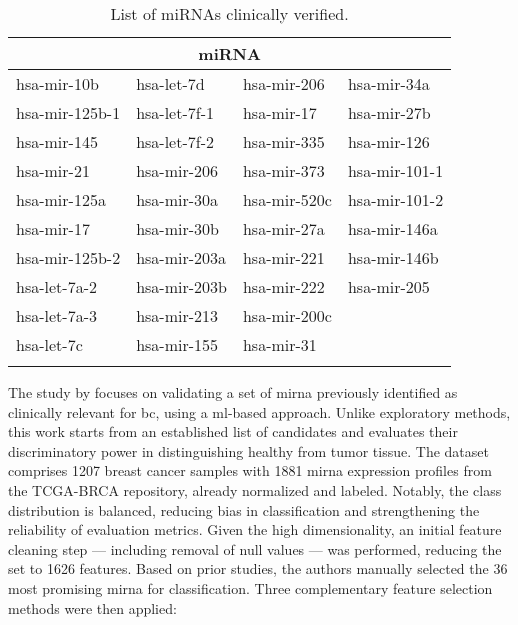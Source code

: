 \begin{table}[h!]
  \centering
  \caption{List of miRNAs clinically verified.}
  \begin{tabular}{llll}
    \toprule
    \multicolumn{4}{c}{\textbf{miRNA} \cite{clinically_important_mirnas}} \\
    \midrule
    hsa-mir-10b    & hsa-let-7d   & hsa-mir-206  & hsa-mir-34a            \\
    hsa-mir-125b-1 & hsa-let-7f-1 & hsa-mir-17   & hsa-mir-27b            \\
    hsa-mir-145    & hsa-let-7f-2 & hsa-mir-335  & hsa-mir-126            \\
    hsa-mir-21     & hsa-mir-206  & hsa-mir-373  & hsa-mir-101-1          \\
    hsa-mir-125a   & hsa-mir-30a  & hsa-mir-520c & hsa-mir-101-2          \\
    hsa-mir-17     & hsa-mir-30b  & hsa-mir-27a  & hsa-mir-146a           \\
    hsa-mir-125b-2 & hsa-mir-203a & hsa-mir-221  & hsa-mir-146b           \\
    hsa-let-7a-2   & hsa-mir-203b & hsa-mir-222  & hsa-mir-205            \\
    hsa-let-7a-3   & hsa-mir-213  & hsa-mir-200c &                        \\
    hsa-let-7c     & hsa-mir-155  & hsa-mir-31   &                        \\
    \bottomrule
    \label{tab:clinically_verified}
  \end{tabular}
\end{table}

The study by \textcite{val_of_mirna_as_biomarker_Rehman_2019} focuses on
validating a set of \gls{mirna} previously identified as clinically relevant
for \gls{bc}, using a \gls{ml}-based approach. Unlike exploratory methods, this
work starts from an established list of candidates and evaluates their
discriminatory power in distinguishing healthy from tumor tissue. The dataset
comprises 1207 breast cancer samples with 1881 \gls{mirna} expression profiles
from the TCGA-BRCA repository, already normalized and labeled. Notably, the
class distribution is balanced, reducing bias in classification and
strengthening the reliability of evaluation metrics. Given the high
dimensionality, an initial feature cleaning step — including removal of null
values — was performed, reducing the set to 1626 features. Based on prior
studies, the authors manually selected the 36 most promising \gls{mirna} for
classification. Three complementary feature selection methods were then
applied:

